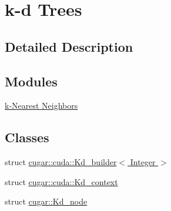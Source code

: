 \hypertarget{group__kdtree}{}\section{k-\/d Trees}
\label{group__kdtree}


\subsection{Detailed Description}
\subsection*{Modules}
\begin{DoxyCompactItemize}
\item 
\hyperlink{group__knn}{k-\/\+Nearest Neighbors}
\end{DoxyCompactItemize}
\subsection*{Classes}
\begin{DoxyCompactItemize}
\item 
struct \hyperlink{structcugar_1_1cuda_1_1_kd__builder}{cugar\+::cuda\+::\+Kd\+\_\+builder$<$ Integer $>$}
\item 
struct \hyperlink{structcugar_1_1cuda_1_1_kd__context}{cugar\+::cuda\+::\+Kd\+\_\+context}
\item 
struct \hyperlink{structcugar_1_1_kd__node}{cugar\+::\+Kd\+\_\+node}
\end{DoxyCompactItemize}
